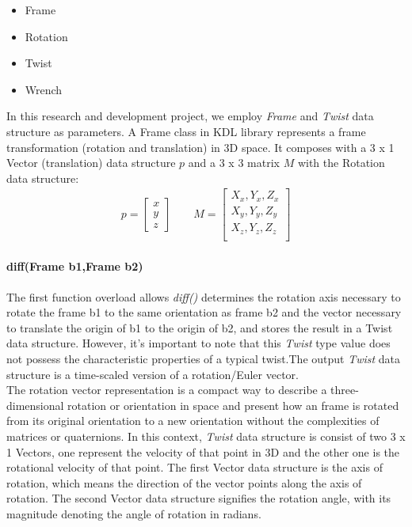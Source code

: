 \documentclass[report.tex]{subfiles}
\begin{document}
    \begin{itemize}
        \item Frame 
        \item Rotation 
        \item Twist 
        \item Wrench 
    \end{itemize}
    In this research and development project, we employ \textit{Frame} and \textit{Twist} data structure as parameters.
    A Frame class in KDL library represents a frame transformation (rotation and translation) in 3D space. It composes with a 3 x 1 Vector (translation) data structure $p$ and a 3 x 3 matrix $M$ with the Rotation data structure:
    \begin{align}
        p = \begin{bmatrix}
            x\\y\\z
        \end{bmatrix} \qquad
        M = \begin{bmatrix}
            X_x,Y_x,Z_x\\
            X_y,Y_y,Z_y\\
            X_z,Y_z,Z_z\\
        \end{bmatrix} 
    \end{align}
    \paragraph{\large{diff(Frame b1,Frame b2)}\\} \label{diff_frame}
    The first function overload allows \textit{diff()} determines the rotation axis necessary to rotate the frame b1 to the same orientation as frame b2 and the vector necessary to translate the origin of b1 to the origin of b2, and stores the result in a Twist data structure. However, it's important to note that this \textit{Twist} type value does not possess the characteristic properties of a typical twist.The output \textit{Twist} data structure is a time-scaled version of a rotation/Euler vector.\\
    The rotation vector representation is a compact way to describe a three-dimensional rotation or orientation in space and present how an frame is rotated from its original orientation to a new orientation without the complexities of matrices or quaternions. In this context, \textit{Twist} data structure is consist of two 3 x 1 Vectors, one represent the velocity of that point in 3D and the other one is the rotational velocity of that point. The first Vector data structure is the axis of rotation, which means the direction of the vector points along the axis of rotation. The second Vector data structure signifies the rotation angle, with its magnitude denoting the angle of rotation in radians.
\end{document}
